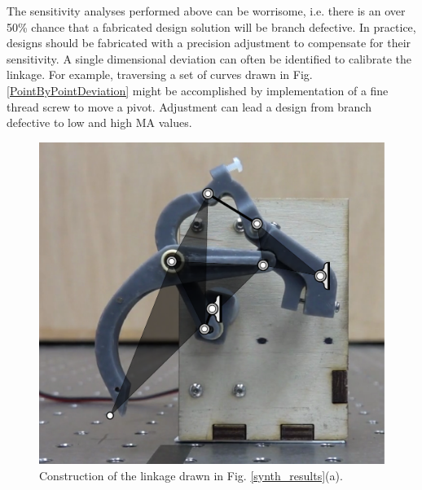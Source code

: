 \documentclass[journal]{IEEEtran}
\begin{document}
The sensitivity analyses performed above can be worrisome, i.e. there is an over 50\% chance that a fabricated design solution will be branch defective.
In practice, designs should be fabricated with a precision adjustment to compensate for their sensitivity.
A single dimensional deviation can often be identified to calibrate the linkage.
For example, traversing a set of curves drawn in Fig. \ref{PointByPointDeviation} might be accomplished by implementation of a fine thread screw to move a pivot.
Adjustment can lead a design from branch defective to low and high MA values.


\begin{figure}[!t]
\centering
\includegraphics[scale=0.3]{prototype_overlay}
\caption{Construction of the linkage drawn in Fig. \ref{synth_results}(a).}
\label{prototype_overlay}
\end{figure}
\end{document}
